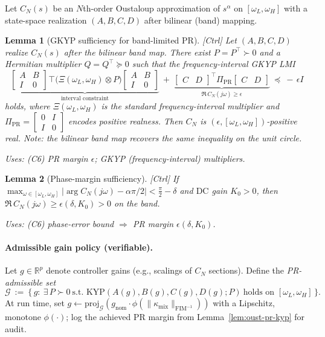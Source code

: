 \documentclass[10pt]{article}
\newcommand{\FIM}{\mathrm{FIM}}
\newcommand{\uses}[1]{\par\smallskip\noindent\textit{Uses: }#1\par\smallskip}
\newtheorem{lemma}{Lemma}
\begin{document}
Let $C_N(s)$ be an $N$th-order Oustaloup approximation of $s^\alpha$ on $[\omega_L,\omega_H]$ with a state-space realization $(A,B,C,D)$ after bilinear (band) mapping.

\begin{lemma}[GKYP sufficiency for band-limited PR]\label{lem:oust-pr-gkyp}
\emph{[\textup{Ctrl}]}
Let $(A,B,C,D)$ realize $C_N(s)$ after the bilinear band map. There exist $P=P^\top\!\succ0$ and a Hermitian multiplier $Q=Q^\top\succeq0$ such that the frequency-interval GKYP LMI
\[
\underbrace{\begin{bmatrix} A & B \\ I & 0 \end{bmatrix}^\!\top\!\big(\Xi(\omega_L,\omega_H)\otimes P\big)\begin{bmatrix} A & B \\ I & 0 \end{bmatrix}}_{\text{interval constraint}}
\ +\ 
\underbrace{\begin{bmatrix} C & D \end{bmatrix}^\top \Pi_{\mathrm{PR}} \begin{bmatrix} C & D \end{bmatrix}}_{\Re\,C_N(j\omega)\ge\epsilon}\ \preceq\ -\,\epsilon I
\]
holds, where $\Xi(\omega_L,\omega_H)$ is the standard frequency-interval multiplier and 
$\Pi_{\mathrm{PR}}=\begin{bmatrix}0 & I\\ I & 0\end{bmatrix}$ encodes positive realness.
Then $C_N$ is $(\epsilon,[\omega_L,\omega_H])$-positive real. 
\emph{Note:} the bilinear band map recovers the same inequality on the unit circle.
\uses{(C6) PR margin $\epsilon$; GKYP (frequency-interval) multipliers.}
\end{lemma}

\begin{lemma}[Phase-margin sufficiency]\label{lem:oust-pr-phase}
\emph{[\textup{Ctrl}]} If $\max_{\omega\in[\omega_L,\omega_H]}|\arg C_N(j\omega)-\alpha\pi/2|<\frac\pi2-\delta$ and $\mathrm{DC}$ gain $K_0>0$, then $\Re\, C_N(j\omega)\ge \epsilon(\delta,K_0)>0$ on the band. 
\uses{(C6) phase-error bound $\Rightarrow$ PR margin $\epsilon(\delta,K_0)$.}
\end{lemma}

\paragraph{Admissible gain policy (verifiable).}
Let $g\in\mathbb R^p$ denote controller gains (e.g., scalings of $C_N$ sections). Define the \emph{PR-admissible set}
\[
\mathcal G\ :=\ \{\,g:\ \exists\,P\succ0\ \text{s.t.\ KYP}(A(g),B(g),C(g),D(g);P)\ \text{holds on }[\omega_L,\omega_H]\,\}.
\]
At run time, set $g\leftarrow \mathrm{proj}_{\mathcal G}(g_{\mathrm{nom}}\cdot \phi(\|\kappa_{\mathrm{mix}}\|_{\FIM^{-1}}))$ with a Lipschitz, monotone $\phi(\cdot)$; log the achieved PR margin from Lemma~\ref{lem:oust-pr-kyp} for audit.
\end{document}
